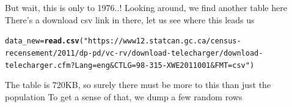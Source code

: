 \documentclass[aspectratio=169]{beamer}\usepackage[]{graphicx}\usepackage[]{xcolor}
\makeatletter
\def\maxwidth{ %
  \ifdim\Gin@nat@width>\linewidth
    \linewidth
  \else
    \Gin@nat@width
  \fi
}
\newcommand{\hlnum}[1]{\textcolor[rgb]{0.686,0.059,0.569}{#1}}%
\newcommand{\hlsng}[1]{\textcolor[rgb]{0.192,0.494,0.8}{#1}}%
\newcommand{\hlopt}[1]{\textcolor[rgb]{0,0,0}{#1}}%
\newcommand{\hldef}[1]{\textcolor[rgb]{0.345,0.345,0.345}{#1}}%
\newcommand{\hlkwb}[1]{\textcolor[rgb]{0.69,0.353,0.396}{#1}}%
\newcommand{\hlkwc}[1]{\textcolor[rgb]{0.333,0.667,0.333}{#1}}%
\newcommand{\hlkwd}[1]{\textcolor[rgb]{0.737,0.353,0.396}{\textbf{#1}}}%
\newenvironment{kframe}{%
 \def\at@end@of@kframe{}%
 \ifinner\ifhmode%
  \def\at@end@of@kframe{\end{minipage}}%
  \begin{minipage}{\columnwidth}%
 \fi\fi%
 \def\FrameCommand##1{\hskip\@totalleftmargin \hskip-\fboxsep
 \colorbox{shadecolor}{##1}\hskip-\fboxsep
     \hskip-\linewidth \hskip-\@totalleftmargin \hskip\columnwidth}%
 \MakeFramed {\advance\hsize-\width
   \@totalleftmargin\z@ \linewidth\hsize
   \@setminipage}}%
 {\par\unskip\endMakeFramed%
 \at@end@of@kframe}
\newenvironment{knitrout}{}{} %
\makeatother
\begin{document}


\begin{frame}[fragile]
But wait, this is only to 1976..! 
\vfill
Looking around, we find another table here
\vfill
There's a download csv link in there, let us see where this leads us
\begin{knitrout}
\color{fgcolor}\begin{kframe}
\begin{alltt}
\hldef{data_new} \hlkwb{=} \hlkwd{read.csv}\hldef{(}\hlsng{"https://www12.statcan.gc.ca/census-recensement/2011/dp-pd/vc-rv/download-telecharger/download-telecharger.cfm?Lang=eng&CTLG=98-315-XWE2011001&FMT=csv"}\hldef{)}
\end{alltt}
\end{kframe}
\end{knitrout}
The table is 720KB, so surely there must be more to this than just the population
\vfill
To get a sense of that, we dump a few random rows
\end{frame}
\end{document}
